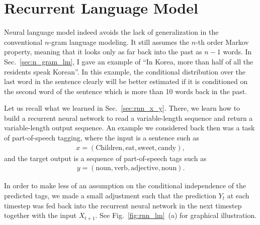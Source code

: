 \documentclass{report}
\begin{document}
\section{Recurrent Language Model}
\label{sec:rlm}

Neural language model indeed avoids the lack of generalization in the
conventional $n$-gram language modeling. It still assumes the $n$-th order
Markov property, meaning that it looks only as far back into the past as $n-1$
words. In Sec.~\ref{sec:n_gram_lm}, I gave an example of ``In Korea, more than
half of all the residents speak Korean''. In this example, the conditional
distribution over the last word in the sentence clearly will be better estimated
if it is conditioned on the second word of the sentence which is more than 10
words back in the past.

Let us recall what we learned in Sec.~\ref{sec:rnn_x_y}. There, we learn how to
build a recurrent neural network to read a variable-length sequence and return a
variable-length output sequence. An example we considered back then was a task
of part-of-speech tagging, where the input is a sentence such as
\begin{align*}
    x = (\text{Children}, \text{eat}, \text{sweet}, \text{candy}),
\end{align*}
and the target output is a sequence of part-of-speech tags such as
\begin{align*}
    y = (\text{noun}, \text{verb}, \text{adjective}, \text{noun}).
\end{align*}

In order to make less of an assumption on the conditional independence of the
predicted tags, we made a small adjustment such that the prediction $Y_{t}$ at
each timestep was fed back into the recurrent neural network in the next
timestep together with the input $X_{t+1}$. See Fig.~\ref{fig:rnn_lm}~(a) for
graphical illustration.
\end{document}
